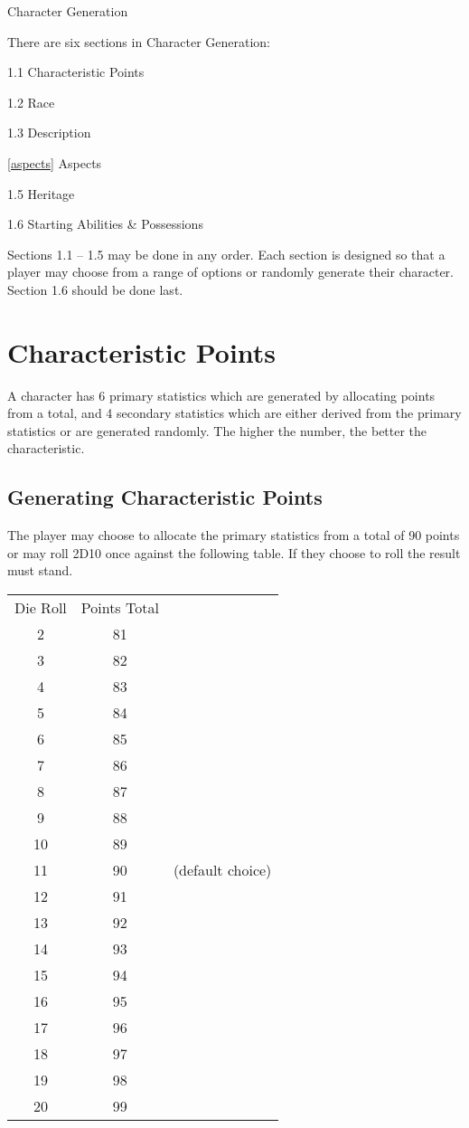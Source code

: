 \begin{Chapter}{Character Generation}

There are six sections in Character Generation: 
\begin{Itemize}
\item 1.1  Characteristic Points 
\item 1.2   Race 
\item 1.3   Description 
\item \ref{aspects}  Aspects
\item 1.5   Heritage 
\item 1.6  Starting Abilities \& Possessions 
\end{Itemize}

Sections 1.1 – 1.5 may be done in any order. Each section is designed
so that a player may choose from a range of options or randomly
generate their character. Section 1.6 should be done last.

\section{Characteristic Points}

A character has 6 primary statistics which are generated by allocating
points from a total, and 4 secondary statistics which are either
derived from the primary statistics or are generated randomly.  The
higher the number, the better the characteristic.

\subsection{Generating Characteristic Points}

The player may choose to allocate the primary statistics from a total
of 90 points or may roll 2D10 once against the following table.  If
they choose to roll the result must stand.

\begin{tabular}{ccl}
Die Roll  & Points Total \\

2	& 81 \\
3	& 82 \\ 
4	& 83 \\
5	& 84 \\
6	& 85 \\
7	& 86 \\
8	& 87 \\
9	& 88 \\
10	& 89 \\
11	& 90 & (default choice) \\
12	& 91 \\
13	& 92 \\
14	& 93 \\
15	& 94 \\
16	& 95 \\
17	& 96 \\
18	& 97 \\
19	& 98 \\
20	& 99 \\
\end{tabular}


\end{Chapter}
